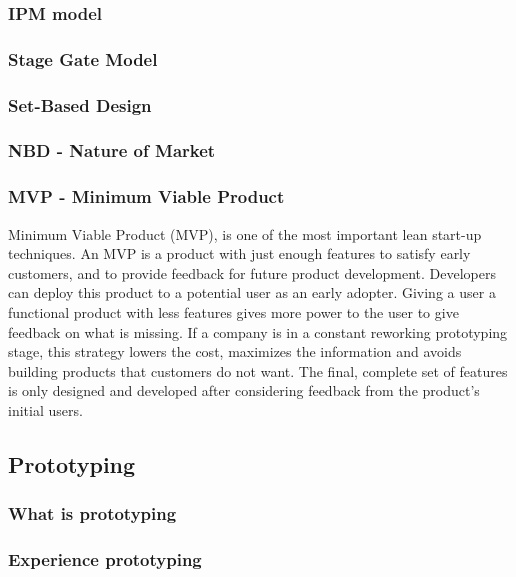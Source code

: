\subsubsection{IPM model}

\subsubsection{Stage Gate Model}

\subsubsection{Set-Based Design}

\subsubsection{NBD - Nature of Market}

\subsubsection{MVP - Minimum Viable Product}
Minimum Viable Product (MVP), is one of the most important lean start-up techniques. An MVP is a product with just enough features to satisfy early customers, and to provide feedback for future product development. Developers can deploy this product to a potential user as an early adopter. Giving a user a functional product with less features gives more power to the user to give feedback on what is missing. If a company is in a constant reworking prototyping stage, this strategy lowers the cost, maximizes the information and avoids building products that customers do not want. The final, complete set of features is only designed and developed after considering feedback from the product's initial users.



\subsection{Prototyping}

\subsubsection{What is prototyping}

\subsubsection{Experience prototyping}

